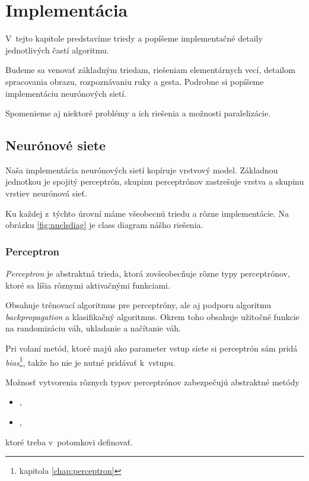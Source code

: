 \chapter{Implementácia}
\label{chap:implementation}

V~tejto kapitole predstavíme triedy a popíšeme implementačné detaily jednotlivých častí algoritmu.

Budeme sa venovať základným triedam, riešeniam elementárnych vecí, detailom spracovania obrazu, rozpoznávaniu ruky a gesta. Podrobne si popíšeme implementáciu neurónových sietí.

Spomenieme aj niektoré problémy a ich riešenia a možnosti paralelizácie.

\bigskip

\section{Neurónové siete}

Naša implementácia neurónových sietí kopíruje vrstvový model. Základnou jednotkou je spojitý perceptrón, skupinu perceptrónov zastrešuje vrstva a skupinu vrstiev neurónová sieť. 

Ku každej z~týchto úrovní máme všeobecnú triedu a rôzne implementácie. Na obrázku \ref{fig:nnclsdiag} je class diagram nášho riešenia.

\subsection{Perceptron}
\label{sect:perceptron}
\textit{Perceptron} je abstraktná trieda, ktorá zovšeobecňuje rôzne typy perceptrónov, ktoré sa líšia rôznymi aktivačnými funkciami.

Obsahuje trénovací algoritmus pre perceptróny, ale aj podporu algoritmu \textit{backpropagation} a klasifikačný algoritmus. Okrem toho obsahuje užitočné funkcie na randomizáciu váh, ukladanie a načítanie váh.

Pri volaní metód, ktoré majú ako parameter vstup siete si perceptrón sám pridá \textit{bias}\footnote{kapitola \ref{chap:perceptron}}, takže ho nie je nutné pridávať k~vstupu.

Možnosť vytvorenia rôznych typov perceptrónov zabezpečujú abstraktné metódy 
\begin{itemize}
\item {},
\item {},
\end{itemize}
ktoré treba v~potomkovi definovať.

